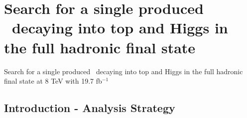 \section[Analysis]{Search for a single produced \Tp~decaying into top and Higgs in the full hadronic final state}
\setcounter{tocdepth}{2}

\begin{frame}
\begin{center}
Search for a single produced \Tp~decaying into top and Higgs in the full hadronic final state at 8 TeV with 19.7 fb$^{-1}$
\end{center}
\end{frame}


\subsection{Introduction - Analysis Strategy}


